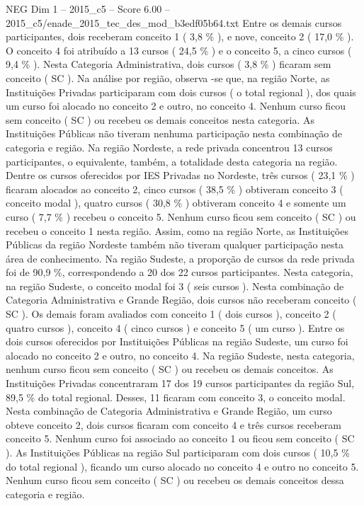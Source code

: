 \begin{textsample}{NEG Dim 1 – 2015\_c5 – Score 6.00 – 2015\_c5/enade\_2015\_tec\_des\_mod\_b3edf05b64.txt}
Entre os demais cursos participantes, dois receberam conceito 1 ( 3,8 \% ), e nove, conceito 2 ( 17,0 \% ).
O conceito 4 foi atribuído a 13 cursos ( 24,5 \% ) e o conceito 5, a cinco cursos ( 9,4 \% ).
Nesta Categoria Administrativa, dois cursos ( 3,8 \% ) ficaram sem conceito ( SC ).
Na análise por região, observa -se que, na região Norte, as Instituições Privadas participaram com dois cursos ( o total regional ), dos quais um curso foi alocado no conceito 2 e outro, no conceito 4.
Nenhum curso ficou sem conceito ( SC ) ou recebeu os demais conceitos nesta categoria.
As Instituições Públicas não tiveram nenhuma participação nesta combinação de categoria e região.
Na região Nordeste, a rede privada concentrou 13 cursos participantes, o equivalente, também, a totalidade desta categoria na região.
Dentre os cursos oferecidos por IES Privadas no Nordeste, três cursos ( 23,1 \% ) ficaram alocados ao conceito 2, cinco cursos ( 38,5 \% ) obtiveram conceito 3 ( conceito modal ), quatro cursos ( 30,8 \% ) obtiveram conceito 4 e somente um curso ( 7,7 \% ) recebeu o conceito 5.
Nenhum curso ficou sem conceito ( SC ) ou recebeu o conceito 1 nesta região.
Assim, como na região Norte, as Instituições Públicas da região Nordeste também não tiveram qualquer participação nesta área de conhecimento.
Na região Sudeste, a proporção de cursos da rede privada foi de 90,9 \%, correspondendo a 20 dos 22 cursos participantes.
Nesta categoria, na região Sudeste, o conceito modal foi 3 ( seis cursos ).
Nesta combinação de Categoria Administrativa e Grande Região, dois cursos não receberam conceito ( SC ).
Os demais foram avaliados com conceito 1 ( dois cursos ), conceito 2 ( quatro cursos ), conceito 4 ( cinco cursos ) e conceito 5 ( um curso ).
Entre os dois cursos oferecidos por Instituições Públicas na região Sudeste, um curso foi alocado no conceito 2 e outro, no conceito 4.
Na região Sudeste, nesta categoria, nenhum curso ficou sem conceito ( SC ) ou recebeu os demais conceitos.
As Instituições Privadas concentraram 17 dos 19 cursos participantes da região Sul, 89,5 \% do total regional.
Desses, 11 ficaram com conceito 3, o conceito modal.
Nesta combinação de Categoria Administrativa e Grande Região, um curso obteve conceito 2, dois cursos ficaram com conceito 4 e três cursos receberam conceito 5.
Nenhum curso foi associado ao conceito 1 ou ficou sem conceito ( SC ).
As Instituições Públicas na região Sul participaram com dois cursos ( 10,5 \% do total regional ), ficando um curso alocado no conceito 4 e outro no conceito 5.
Nenhum curso ficou sem conceito ( SC ) ou recebeu os demais conceitos dessa categoria e região.

\end{textsample}
